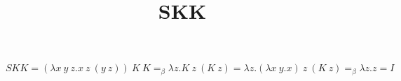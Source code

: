 \documentclass{article}
\title{SKK}
\begin{document}
\maketitle

$S K K = (\lambda x\ y\ z.x\ z\ (y\ z))\ K\ K =_\beta \lambda z.K\ z\ (K\ z) = \lambda z.(\lambda x\ y.x)\ z\ (K\ z) =_\beta \lambda z.z = I$
\end{document}
